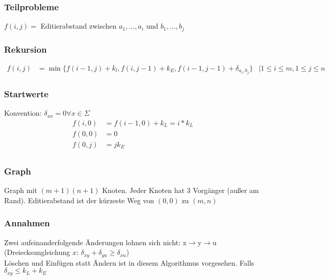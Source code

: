 \subsubsection{Teilprobleme}
$f(i,j) =$ Editierabstand zwischen $a_1, ... , a_i$ und $b_1, ... , b_j$
\subsubsection{Rekursion}
\begin{align*}
f(i,j) &= \min\{ f(i-1,j) + k_l, f(i,j-1)+k_E, f(i-1,j-1) + \delta_{a_i,b_j}\} &| 1\leq i \leq m, 1 \leq j \leq n
\end{align*}
\subsubsection{Startwerte}
Konvention: $\delta_{xx} = 0 \forall x \in \Sigma$
\begin{align*}
f(i,0) &= f(i-1,0) + k_L = i*k_L\\
f(0,0) &= 0\\
f(0,j) &= j k_E\\
\end{align*}

\subsubsection{Graph}
Graph mit $(m+1)(n+1)$ Knoten. Jeder Knoten hat 3 Vorgänger (außer am Rand).
Editierabstand ist der kürzeste Weg von $(0,0)$ zu $(m,n)$
\subsubsection{Annahmen}
Zwei aufeinanderfolgende Änderungen lohnen sich nicht:
x$\rightarrow$y$\rightarrow$u (Dreiecksungleichung $x$: $\delta_{xy}+\delta_{yu}\geq \delta_{xu}$)\\
Löschen und Einfügen statt Ändern ist in diesem Algorithmus vorgesehen. Falls $\delta_{xy} \leq k_L + k_E$\\
